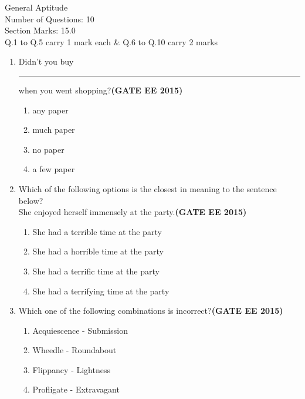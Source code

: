 \documentclass[a4paper,12pt]{exam}
\theoremstyle{remark}
\begin{document}
\vspace{0.5cm}
General Aptitude\\
Number of Questions: 10\\
Section Marks: 15.0\\
\vspace{0.5cm}
 Q.1 to Q.5 carry 1 mark each \& Q.6 to Q.10 carry 2 marks
\begin{enumerate}
\item Didn't you buy \rule{3cm}{0.15mm} when you went shopping?\hfill{\textbf{(GATE EE 2015)}} 
    \begin{multicols}{4}
    \begin{enumerate}   
        \item any paper
        \item much paper
        \item no paper
        \item a few paper
    \end{enumerate}
    \end{multicols}

\item Which of the following options is the closest in meaning to the sentence below?\\
She enjoyed herself immensely at the party.\hfill{\textbf{(GATE EE 2015)}}
   
    \begin{enumerate}   
        \item She had a terrible time at the party
        \item She had a horrible time at the party
        \item She had a terrific time at the party
        \item She had a terrifying time at the party
    \end{enumerate}
 

\item Which one of the following combinations is incorrect?\hfill{\textbf{(GATE EE 2015)}}
    \begin{multicols}{2}
    \begin{enumerate}   
        \item Acquiescence - Submission
        \item Wheedle - Roundabout
        \item Flippancy - Lightness
        \item Profligate - Extravagant
    \end{enumerate}
    \end{multicols}


\end{enumerate}
\end{document}
